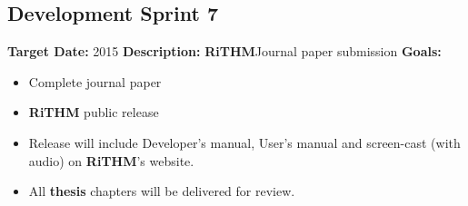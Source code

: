 \documentclass[]{article}
\newcommand{\rithm}{\textbf{RiTHM}\space}
\begin{document}
\subsection{Development Sprint 7}
\textbf{Target Date:}\space {} {2015}\newline
\textbf{Description:} \rithm Journal paper submission \newline
\textbf{Goals:}
\begin{itemize}
	\item
	Complete journal paper
	\item
	\rithm 2.0 public release 
	\item
	Release will include Developer's manual, User's manual and screen-cast (with audio) on \rithm's website.
	\item
	All \textbf{thesis} chapters will be delivered for review.
\end{itemize}
\end{document}
